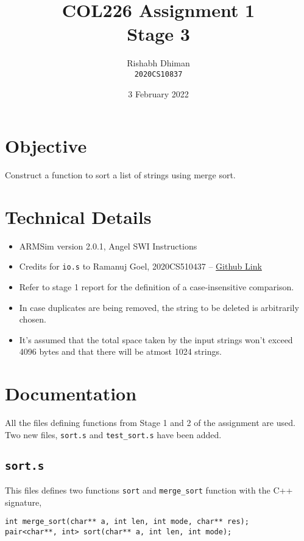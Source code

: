 \documentclass[a4paper]{scrartcl}
\title{COL226 Assignment 1\\{\Large Stage 3}}
\date{3 February 2022}
\author{Rishabh Dhiman\\ \texttt{2020CS10837}}
\theoremstyle{definition}
\renewcommand{\tt}{\texttt}
\newcommand{\fun}{\texttt}
\begin{document}
\maketitle

\section{Objective}
Construct a function to sort a list of strings using merge sort.

\section{Technical Details}
\begin{itemize}
	\item ARMSim version 2.0.1, Angel SWI Instructions
	\item Credits for \tt{io.s} to Ramanuj Goel, 2020CS510437 -- \href{https://github.com/taitaisama/Arm_io}{Github Link}
	\item Refer to stage 1 report for the definition of a case-insensitive comparison.
	\item In case duplicates are being removed, the string to be deleted is arbitrarily chosen.
	\item It's assumed that the total space taken by the input strings won't exceed 4096 bytes and that there will be atmost 1024 strings.
\end{itemize}

\section{Documentation}
All the files defining functions from Stage 1 and 2 of the assignment are used. Two new files, \tt{sort.s} and \tt{test_sort.s} have been added.

\subsection*{\tt{sort.s}}
This files defines two functions \fun{sort} and \fun{merge_sort} function with the C++ signature,
\begin{verbatim}
int merge_sort(char** a, int len, int mode, char** res);
pair<char**, int> sort(char** a, int len, int mode);
\end{verbatim}
\end{document}
